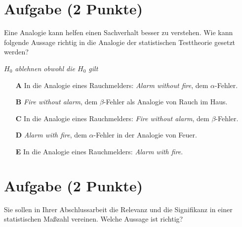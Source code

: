 \documentclass[a4paper, 9pt]{scrartcl}\usepackage[]{graphicx}\usepackage[]{xcolor}
\begin{document}

\section{Aufgabe \hfill (2 Punkte)}



Eine Analogie kann helfen einen Sachverhalt besser zu verstehen. Wie kann folgende Aussage richtig in die Analogie der statistischen Testtheorie gesetzt werden?

\begin{center}
\textit{$H_0$ ablehnen obwohl die $H_0$ gilt}
\end{center}



\begin{enumerate}
\item [\textbf{A} \msquare] In die Analogie eines Rauchmelders: \textit{Alarm without fire}, dem $\alpha$-Fehler.
\item [\textbf{B} \msquare] \textit{Fire without alarm}, dem $\beta$-Fehler als Analogie von Rauch im Haus.
\item [\textbf{C} \msquare] In die Analogie eines Rauchmelders: \textit{Fire without alarm}, dem $\beta$-Fehler.
\item [\textbf{D} \msquare] \textit{Alarm with fire}, dem $\alpha$-Fehler in der Analogie von Feuer.
\item [\textbf{E} \msquare] In die Analogie eines Rauchmelders: \textit{Alarm with fire}.
\end{enumerate}

\section{Aufgabe \hfill (2 Punkte)}



Sie sollen in Ihrer Abschlussarbeit die Relevanz und die Signifikanz in einer statistischen Maßzahl vereinen. Welche Aussage ist richtig?
\end{document}
